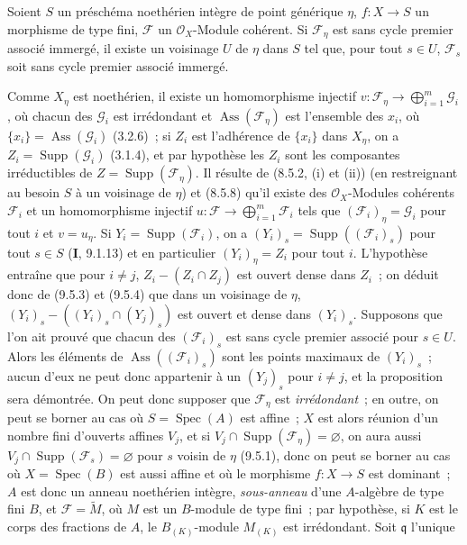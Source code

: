 \begin{proposition}[9.7.6]
\label{IV.9.7.6-fr}
Soient $S$ un préschéma noethérien intègre de point générique $\eta$, $f:X\to S$
un morphisme de type fini, $\mathcal F$ un $\mathcal O_X$-Module cohérent. Si
$\mathcal F_\eta$ est sans cycle premier associé immergé, il existe un voisinage
$U$ de $\eta$ dans $S$ tel que, pour tout $s\in U$, $\mathcal F_s$ soit sans cycle
premier associé immergé.
\end{proposition}

Comme $X_\eta$ est noethérien, il existe un homomorphisme injectif
$v:\mathcal F_\eta\to\bigoplus_{i=1}^m\mathcal G_i$, où chacun des $\mathcal G_i$ est
irrédondant et $\operatorname{Ass}(\mathcal F_\eta)$ est l'ensemble des $x_i$, où
$\{x_i\}=\operatorname{Ass}(\mathcal G_i)$ (3.2.6)~; si $Z_i$ est l'adhérence de
$\{x_i\}$ dans $X_\eta$, on a $Z_i=\operatorname{Supp}(\mathcal G_i)$ (3.1.4), et
par hypothèse les $Z_i$ sont les composantes irréductibles de
$Z=\operatorname{Supp}(\mathcal F_\eta)$. Il résulte de (8.5.2, (i) et (ii)) (en
restreignant au besoin $S$ à un voisinage de $\eta$) et (8.5.8) qu'il existe des
$\mathcal O_X$-Modules cohérents $\mathcal F_i$ et un homomorphisme injectif
$u:\mathcal F\to\bigoplus_{i=1}^m\mathcal F_i$ tels que $(\mathcal F_i)_\eta=\mathcal G_i$ pour
tout $i$ et $v=u_\eta$. Si $Y_i=\operatorname{Supp}(\mathcal F_i)$, on a
$(Y_i)_s=\operatorname{Supp}((\mathcal F_i)_s)$ pour tout $s\in S$
(\textbf{I}, 9.1.13) et en particulier $(Y_i)_\eta=Z_i$ pour tout $i$.
L'hypothèse entraîne que pour $i\neq j$, $Z_i-(Z_i\cap Z_j)$ est ouvert dense
dans $Z_i$~; on déduit donc de (9.5.3) et (9.5.4) que dans un voisinage de
$\eta$, $(Y_i)_s-((Y_i)_s\cap(Y_j)_s)$ est ouvert et dense dans $(Y_i)_s$.
Supposons que l'on ait prouvé que chacun des $(\mathcal F_i)_s$ est sans cycle
premier associé pour $s\in U$. Alors les éléments de
$\operatorname{Ass}((\mathcal F_i)_s)$ sont les points maximaux de $(Y_i)_s$~;
aucun d'eux ne peut donc appartenir à un $(Y_j)_s$ pour $i\neq j$, et la
proposition sera démontrée. On peut donc supposer que $\mathcal F_\eta$ est
\emph{irrédondant}~; en outre, on peut se borner au cas où
$S=\operatorname{Spec}(A)$ est affine~; $X$ est alors réunion d'un nombre fini
d'ouverts affines $V_j$, et si $V_j\cap\operatorname{Supp}(\mathcal F_\eta)
=\varnothing$, on aura aussi $V_j\cap\operatorname{Supp}(\mathcal F_s)=\varnothing$
pour $s$ voisin de $\eta$ (9.5.1), donc on peut se borner au cas où
$X=\operatorname{Spec}(B)$ est aussi affine et où le morphisme $f:X\to S$ est
dominant~; $A$ est donc un anneau noethérien intègre, \emph{sous-anneau} d'une
$A$-algèbre de type fini $B$, et $\mathcal F=\widetilde M$, où $M$ est un
$B$-module de type fini~; par hypothèse, si $K$ est le corps des fractions de
$A$, le $B_{(K)}$-module $M_{(K)}$ est irrédondant. Soit $\mathfrak q$ l'unique

